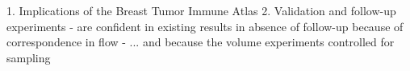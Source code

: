 1. Implications of the Breast Tumor Immune Atlas
2. Validation and follow-up experiments
- are confident in existing results in absence of follow-up because of correspondence in flow 
- ... and because the volume experiments controlled for sampling
